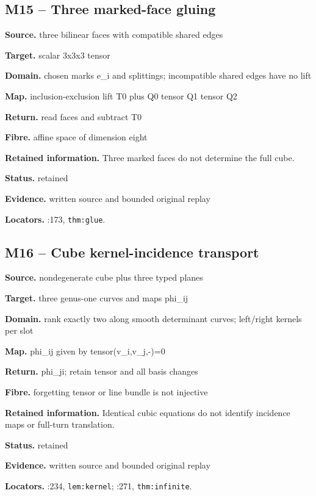 \subsection*{M15 -- Three marked-face gluing}
\noindent\textbf{Source.} three bilinear faces with compatible shared edges\par
\noindent\textbf{Target.} scalar 3x3x3 tensor\par
\noindent\textbf{Domain.} chosen marks e\_i and splittings; incompatible shared edges have no lift\par
\noindent\textbf{Map.} inclusion-exclusion lift T0 plus Q0 tensor Q1 tensor Q2\par
\noindent\textbf{Return.} read faces and subtract T0\par
\noindent\textbf{Fibre.} affine space of dimension eight\par
\noindent\textbf{Retained information.} Three marked faces do not determine the full cube.\par
\noindent\textbf{Status.} retained\par
\noindent\textbf{Evidence.} written source and bounded original replay\par
\noindent\textbf{Locators.} :173, \texttt{thm:glue}.
\subsection*{M16 -- Cube kernel-incidence transport}
\noindent\textbf{Source.} nondegenerate cube plus three typed planes\par
\noindent\textbf{Target.} three genus-one curves and maps phi\_ij\par
\noindent\textbf{Domain.} rank exactly two along smooth determinant curves; left/right kernels per slot\par
\noindent\textbf{Map.} phi\_ij given by tensor(v\_i,v\_j,-)=0\par
\noindent\textbf{Return.} phi\_ji; retain tensor and all basis changes\par
\noindent\textbf{Fibre.} forgetting tensor or line bundle is not injective\par
\noindent\textbf{Retained information.} Identical cubic equations do not identify incidence maps or full-turn translation.\par
\noindent\textbf{Status.} retained\par
\noindent\textbf{Evidence.} written source and bounded original replay\par
\noindent\textbf{Locators.} :234, \texttt{lem:kernel}; :271, \texttt{thm:infinite}.
